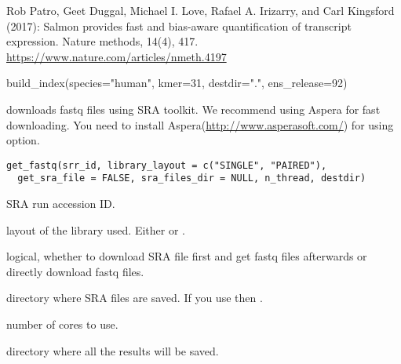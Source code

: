 \documentclass[letterpaper]{book}
\begin{document}
%
\begin{References}\relax
Rob Patro, Geet Duggal, Michael I. Love, Rafael A. Irizarry, and Carl Kingsford (2017):
Salmon provides fast and bias-aware quantification of transcript expression. Nature methods, 14(4), 417.
\url{https://www.nature.com/articles/nmeth.4197}
\end{References}
%
\begin{Examples}
\begin{ExampleCode}

build_index(species="human", kmer=31, destdir=".", ens_release=92)

\end{ExampleCode}
\end{Examples}
%
\begin{Description}\relax
{} downloads fastq files using SRA toolkit. 
We recommend using Aspera for fast downloading. You need to install Aspera(\url{http://www.asperasoft.com/}) for using  option.
\end{Description}
%
\begin{Usage}
\begin{verbatim}
get_fastq(srr_id, library_layout = c("SINGLE", "PAIRED"),
  get_sra_file = FALSE, sra_files_dir = NULL, n_thread, destdir)
\end{verbatim}
\end{Usage}
%
\begin{Arguments}
\begin{ldescription}
\item[\code{srr\_id}] SRA run accession ID.

\item[\code{library\_layout}] layout of the library used. Either  or .

\item[\code{get\_sra\_file}] logical, whether to download SRA file first and get fastq files afterwards or directly download fastq files.

\item[\code{sra\_files\_dir}] directory where SRA files are saved. If you use  then .

\item[\code{n\_thread}] number of cores to use.

\item[\code{destdir}] directory where all the results will be saved.
\end{ldescription}
\end{Arguments}
\end{document}
